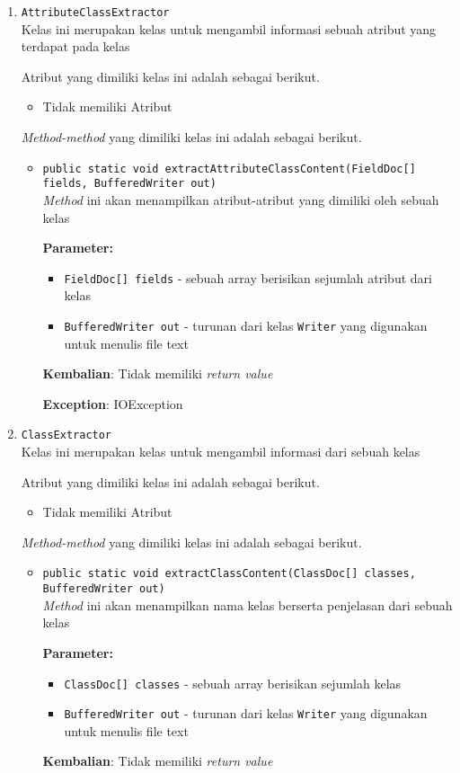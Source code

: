 \begin{enumerate}
\item \texttt{AttributeClassExtractor}\\ 
Kelas ini merupakan kelas untuk mengambil informasi sebuah atribut yang terdapat pada kelas

Atribut yang dimiliki kelas ini adalah sebagai berikut.
\begin{itemize}
\item Tidak memiliki Atribut
\end{itemize}
\textit{Method-method} yang dimiliki kelas ini adalah sebagai berikut.
\begin{itemize}
\item \texttt{public static void extractAttributeClassContent(FieldDoc[] fields, BufferedWriter out)}\\ 
\textit{Method} ini akan menampilkan atribut-atribut yang dimiliki oleh sebuah kelas

\textbf{Parameter:}
\begin{itemize}
\item \texttt{FieldDoc[] fields} - 
sebuah array berisikan sejumlah atribut dari kelas
\item \texttt{BufferedWriter out} - 
turunan dari kelas \texttt{Writer} yang digunakan untuk menulis file text
\end{itemize}
\textbf{Kembalian}: Tidak memiliki \textit{return value}

\textbf{Exception}: IOException

\end{itemize}
\item \texttt{ClassExtractor}\\ 
Kelas ini merupakan kelas untuk mengambil informasi dari sebuah kelas

Atribut yang dimiliki kelas ini adalah sebagai berikut.
\begin{itemize}
\item Tidak memiliki Atribut
\end{itemize}
\textit{Method-method} yang dimiliki kelas ini adalah sebagai berikut.
\begin{itemize}
\item \texttt{public static void extractClassContent(ClassDoc[] classes, BufferedWriter out)}\\ 
\textit{Method} ini akan menampilkan nama kelas berserta penjelasan dari sebuah kelas

\textbf{Parameter:}
\begin{itemize}
\item \texttt{ClassDoc[] classes} - 
sebuah array berisikan sejumlah kelas
\item \texttt{BufferedWriter out} - 
turunan dari kelas \texttt{Writer} yang digunakan untuk menulis file text
\end{itemize}
\textbf{Kembalian}: Tidak memiliki \textit{return value}


\end{itemize}
\end{enumerate}
